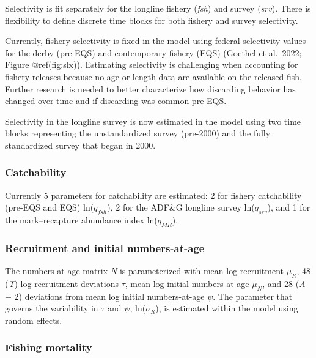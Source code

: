 \documentclass[
]{article}
\begin{document}
Selectivity is fit separately for the longline fishery (\emph{fsh}) and
survey (\emph{srv}). There is flexibility to define discrete time blocks
for both fishery and survey selectivity.

Currently, fishery selectivity is fixed in the model using federal
selectivity values for the derby (pre-EQS) and contemporary fishery
(EQS) (Goethel et al.~2022; Figure @ref(fig:slx)). Estimating
selectivity is challenging when accounting for fishery releases because
no age or length data are available on the released fish. Further
research is needed to better characterize how discarding behavior has
changed over time and if discarding was common pre-EQS.

Selectivity in the longline survey is now estimated in the model using
two time blocks representing the unstandardized survey (pre-2000) and
the fully standardized survey that began in 2000.

\hypertarget{catchability}{%
\subsubsection{Catchability}\label{catchability}}

Currently 5 parameters for catchability are estimated: 2 for fishery
catchability (pre-EQS and EQS) ln(\emph{\(q_{fsh}\)}), 2 for the ADF\&G
longline survey ln(\emph{\(q_{srv}\)}), and 1 for the mark--recapture
abundance index ln(\emph{\(q_{MR}\)}).

\hypertarget{recruitment-and-initial-numbers-at-age}{%
\subsubsection{Recruitment and initial
numbers-at-age}\label{recruitment-and-initial-numbers-at-age}}

The numbers-at-age matrix \emph{N} is parameterized with mean
log-recruitment \emph{\(\mu_R\)}, 48 (\emph{T}) log recruitment
deviations \emph{\(\tau\)}, mean log initial numbers-at-age
\emph{\(\mu_N\)}, and 28 (\emph{A} − 2) deviations from mean log initial
numbers-at-age \emph{\(\psi\)}. The parameter that governs the
variability in \emph{\(\tau\)} and \emph{\(\psi\)},
ln(\emph{\(\sigma_R\)}), is estimated within the model using random
effects.

\hypertarget{fishing-mortality}{%
\subsubsection{Fishing mortality}\label{fishing-mortality}}
\end{document}
